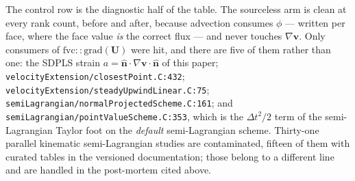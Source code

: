 \documentclass[preprint,3p,11pt]{elsarticle}
\newcommand{\nhat}{\hat{\mathbf{n}}}
\begin{document}
The control row is the diagnostic half of the table. The sourceless arm is clean at
every rank count, before and after, because advection consumes $\phi$ --- written
per face, where the face value \emph{is} the correct flux --- and never touches
$\nabla\mathbf{v}$. Only consumers of $\mathrm{fvc::grad}(\mathbf{U})$ were hit,
and there are five of them rather than one: the SDPLS strain
$a = \nhat\cdot\nabla\mathbf{v}\cdot\nhat$ of this paper;
\texttt{velocityExtension/closestPoint.C:432};
\texttt{velocityExtension/steadyUpwindLinear.C:75};
\texttt{semiLagrangian/normalProjectedScheme.C:161}; and
\texttt{semiLagrangian/pointValueScheme.C:353}, which is the $\Delta t^2/2$ term of
the semi-Lagrangian Taylor foot on the \emph{default} semi-Lagrangian scheme.
Thirty-one parallel kinematic semi-Lagrangian studies are contaminated, fifteen of
them with curated tables in the versioned documentation; those belong to a
different line and are handled in the post-mortem cited above.
\end{document}
